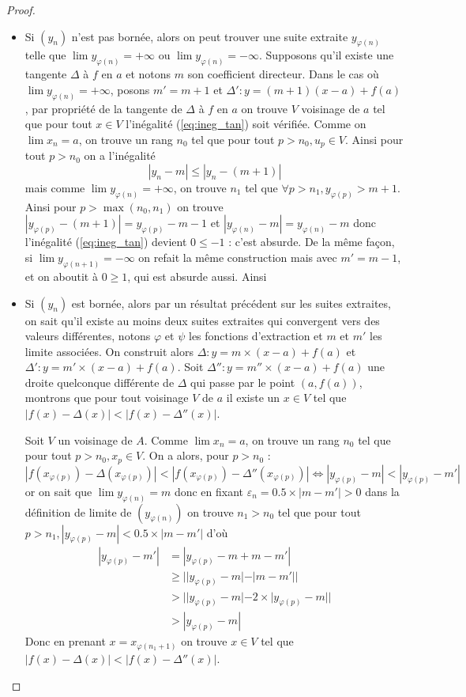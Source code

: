 \begin{proof}
    \begin{itemize}[label=$\bullet$]
        \item Si $(y_n)$ n'est pas bornée, alors on peut trouver une suite extraite $y_{\varphi(n)}$ telle que $\lim y_{\varphi(n)} = +\infty$ ou $\lim y_{\varphi(n)} = -\infty$. Supposons qu'il existe une tangente $\Delta$ à $f$ en $a$ et notons $m$ son coefficient directeur. Dans le cas où $\lim y_{\varphi(n)} = +\infty$, posons $m' = m + 1$ et $\Delta' : y = (m+1)(x-a) + f(a)$, par propriété de la tangente de $\Delta$ à $f$ en $a$ on trouve $V$ voisinage de $a$ tel que pour tout $x\in V$ l'inégalité (\ref{eq:ineg_tan}) soit vérifiée. Comme on $\lim x_n = a$, on trouve un rang $n_0$ tel que pour tout $p > n_0, u_p \in V$. Ainsi pour tout $p > n_0$ on a l'inégalité $$|y_n - m| \leq |y_n-(m+1)|$$ mais comme $\lim y_{\varphi(n)} = +\infty$, on trouve $n_1$ tel que $\forall p > n_1, y_{\varphi(p)} > m+1$. Ainsi pour $p > \max(n_0,n_1)$ on trouve $|y_{\varphi(p)}-(m+1)| = y_{\varphi(p)}-m - 1$ et $|y_{\varphi(n)} - m| = y_{\varphi(n)} - m$ donc l'inégalité (\ref{eq:ineg_tan}) devient $0 \leq -1$ : c'est absurde. De la même façon, si $\lim y_{\varphi(n+1)} = -\infty$ on refait la même construction mais avec $m' = m-1$, et on aboutit à $0 \geq 1$, qui est absurde aussi. Ainsi 

        \item Si $(y_n)$ est bornée, alors par un résultat précédent sur les suites extraites, on sait qu'il existe au moins deux suites extraites qui convergent vers des valeurs différentes, notons $\varphi$ et $\psi$ les fonctions d'extraction et $m$ et $m'$ les limite associées. On construit alors $\Delta : y = m\times (x-a)+f(a)$ et $\Delta' : y = m'\times (x-a) + f(a)$. Soit $\Delta'' : y = m''\times (x-a)+f(a)$ une droite quelconque différente de $\Delta$ qui passe par le point $(a,f(a))$, montrons que pour tout voisinage $V$ de $a$ il existe un $x\in V$ tel que $|f(x)-\Delta(x)| < |f(x)-\Delta''(x)|$.

        Soit $V$ un voisinage de $A$. Comme $\lim x_n = a$, on trouve un rang $n_0$ tel que pour tout $p > n_0, x_p \in V$. On a alors, pour $p > n_0$ : $$|f(x_{\varphi(p)}) - \Delta(x_{\varphi(p)})| < |f(x_{\varphi(p)})-\Delta''(x_{\varphi(p)})| \iff |y_{\varphi(p)} - m| < |y_{\varphi(p)} - m'|$$ or on sait que $\lim y_{\varphi(n)} = m$ donc en fixant $\varepsilon_n = 0.5\times|m-m'| > 0$ dans la définition de limite de $(y_{\varphi(n)})$ on trouve $n_1 > n_0$ tel que pour tout $p > n_1, |y_{\varphi(p)} - m| < 0.5\times|m - m'|$ d'où \begin{align*}
            |y_{\varphi(p)}-m'| &= |y_{\varphi(p)} - m + m - m'|\\
            &\geq ||y_{\varphi(p)} - m| - |m-m'||\\
            &> ||y_{\varphi(p)} - m| - 2\times |y_{\varphi(p)} - m||\\
            &> |y_{\varphi(p)} - m|
        \end{align*}
        Donc en prenant $x = x_{\varphi(n_1 + 1)}$ on trouve $x\in V$ tel que $|f(x)-\Delta(x)| < |f(x)-\Delta''(x)|$.


\end{itemize}
\end{proof}
